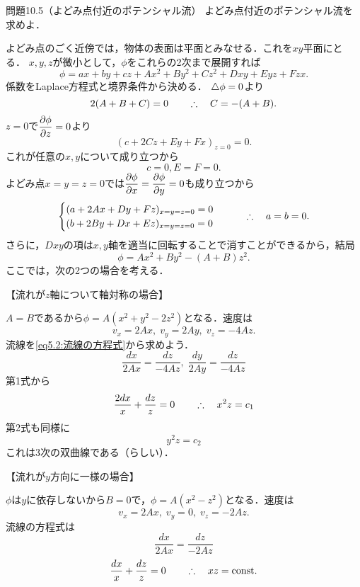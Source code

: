 \begin{mondai}{}{問題10.5（よどみ点付近のポテンシャル流）}
よどみ点付近のポテンシャル流を求めよ．
\end{mondai}
\begin{kaitou}
よどみ点のごく近傍では，物体の表面は平面とみなせる．これを$xy$平面にとる．
$x,y,z$が微小として，$\phi$をこれらの2次まで展開すれば
\[
   \phi = ax+by+cz + Ax^2+By^2+Cz^2 + Dxy+Eyz+Fzx .
\]
係数をLaplace方程式と境界条件から決める．
$\triangle\phi=0$より
\[
    2(A+B+C)=0
    \qquad\therefore\quad C = -(A+B) .
\]
$z=0$で$\dpdv{\phi}{z}=0$より
\[
    (c+2Cz+Ey+Fx)_{z=0} = 0.
\]
これが任意の$x,y$について成り立つから
\[
    c=0, E=F=0.
\]
よどみ点$x=y=z=0$では$\dpdv{\phi}{x}=\dpdv{\phi}{y}=0$も成り立つから
\[
    \begin{cases}
        (a+2Ax+Dy+Fz)_{x=y=z=0} = 0 \\
        (b+2By+Dx+Ez)_{x=y=z=0} = 0 \\
    \end{cases}
    \qquad\therefore\quad a=b=0 .
\]
さらに，$Dxy$の項は$x,y$軸を適当に回転することで消すことができるから，結局
\[
    \phi = Ax^2 + By^2 -(A+B)z^2 .
\]
ここでは，次の2つの場合を考える．


\noindent
【流れが$z$軸について軸対称の場合】

$A=B$であるから$\phi=A(x^2+y^2-2z^2)$となる．速度は
\[
    v_x = 2Ax, \; v_y = 2Ay, \; v_z = -4Az.
\]
流線を\eqref{eq5.2:流線の方程式}から求めよう．
\[
    \frac{dx}{2Ax} = \frac{dz}{-4Az} , \;
    \frac{dy}{2Ay} = \frac{dz}{-4Az}  
\]
第1式から
\[
    \frac{2dx}{x} + \frac{dz}{z} = 0
    \qquad\therefore\quad x^2z = c_1
\]
第2式も同様に
\[
    y^2z = c_2
\]
これは3次の双曲線である（らしい）．


\noindent
【流れが$y$方向に一様の場合】

$\phi$は$y$に依存しないから$B=0$で，$\phi=A(x^2-z^2)$となる．速度は
\[
    v_x = 2Ax, \; v_y = 0, \; v_z = -2Az.
\]
流線の方程式は
\[
    \frac{dx}{2Ax} = \frac{dz}{-2Az}
\]
\[
    \frac{dx}{x} + \frac{dz}{z} = 0
    \qquad\therefore\quad xz = \mathrm{const.}
\]



\end{kaitou}




